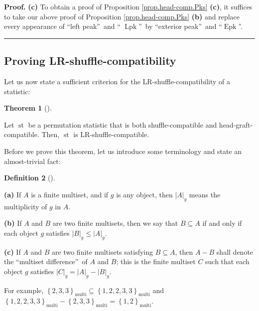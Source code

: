 \documentclass[numbers=enddot,12pt,final,onecolumn,notitlepage]{scrartcl}%
\theoremstyle{definition}
\newtheorem{theo}{Theorem}[section]
\newenvironment{theorem}[1][]
{\begin{theo}[#1]\begin{leftbar}}
{\end{leftbar}\end{theo}}
\newtheorem{defi}[theo]{Definition}
\newenvironment{definition}[1][]
{\begin{defi}[#1]\begin{leftbar}}
{\end{leftbar}\end{defi}}
\newenvironment{proof}[1][Proof]{\noindent\textbf{#1.} }{\ \rule{0.5em}{0.5em}}
\begin{document}
\begin{proof}
\textbf{(c)} To obtain a proof of Proposition \ref{prop.head-comp.Pks}
\textbf{(c)}, it suffices to take our above proof of Proposition
\ref{prop.head-comp.Pks} \textbf{(b)} and replace every appearance of
\textquotedblleft left peak\textquotedblright\ and \textquotedblleft%
$\operatorname*{Lpk}$\textquotedblright\ by \textquotedblleft exterior
peak\textquotedblright\ and \textquotedblleft$\operatorname*{Epk}%
$\textquotedblright.
\end{proof}

\subsection{Proving LR-shuffle-compatibility}

Let us now state a sufficient criterion for the LR-shuffle-compatibility of a statistic:

\begin{theorem}
\label{thm.head-comp.LRcomp}Let $\operatorname*{st}$ be a permutation
statistic that is both shuffle-compatible and head-graft-compatible. Then,
$\operatorname*{st}$ is LR-shuffle-compatible.
\end{theorem}

Before we prove this theorem, let us introduce some terminology and state an
almost-trivial fact:

\begin{definition}
\textbf{(a)} If $A$ is a finite multiset, and if $g$ is any object, then
$\left\vert A\right\vert _{g}$ means the multiplicity of $g$ in $A$.

\textbf{(b)} If $A$ and $B$ are two finite multisets, then we say that
$B\subseteq A$ if and only if each object $g$ satisfies $\left\vert
B\right\vert _{g}\leq\left\vert A\right\vert _{g}$.

\textbf{(c)} If $A$ and $B$ are two finite multisets satisfying $B\subseteq
A$, then $A-B$ shall denote the \textquotedblleft multiset
difference\textquotedblright\ of $A$ and $B$; this is the finite
multiset $C$ such
that each object $g$ satisfies $\left\vert C\right\vert _{g}=\left\vert
A\right\vert _{g}-\left\vert B\right\vert _{g}$.
\end{definition}

For example, $\left\{  2,3,3\right\}  _{\operatorname*{multi}}\subseteq
\left\{  1,2,2,3,3\right\}  _{\operatorname*{multi}}$ and $\left\{
1,2,2,3,3\right\}  _{\operatorname*{multi}}-\left\{  2,3,3\right\}
_{\operatorname*{multi}}=\left\{  1,2\right\}  _{\operatorname*{multi}}$.
\end{document}
